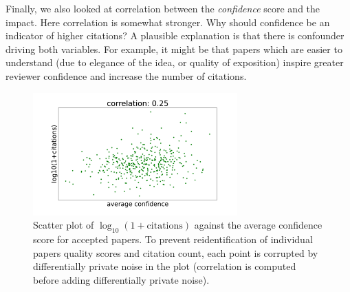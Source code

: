 Finally, we also looked at correlation between the \emph{confidence}
score and the impact. Here correlation is somewhat stronger. Why should
confidence be an indicator of higher citations? A plausible explanation
is that there is confounder driving both variables. For example, it
might be that papers which are easier to understand (due to elegance of
the idea, or quality of exposition) inspire greater reviewer confidence
and increase the number of citations.

\begin{figure}[htb]
\includegraphics[width=0.70\textwidth]{diagrams/neurips/citations-vs-average-confidence-accept.pdf}


\caption{Scatter plot of $\log_{10}(1+\text{citations})$ against the average confidence score for accepted papers. To prevent reidentification of individual papers quality scores and citation count, each point is corrupted by differentially private noise in the plot (correlation is computed before adding differentially private noise).}
\label{citations-vs-average-confidence-accept}
\end{figure}


